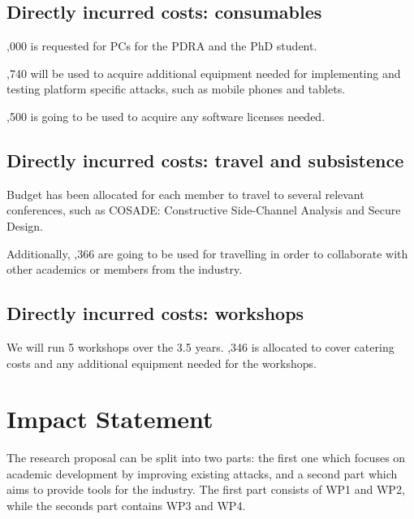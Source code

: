 \documentclass[a4paper,11pt]{article}
\begin{document}
\subsection*{Directly incurred costs: consumables}
,000 is requested for PCs for the PDRA and the PhD student.

,740 will be used to acquire additional equipment needed for implementing and testing platform specific attacks, such as mobile phones and tablets.

,500 is going to be used to acquire any software licenses needed.

\subsection*{Directly incurred costs: travel and subsistence}
Budget has been allocated for each member to travel to several relevant conferences, such as COSADE: Constructive Side-Channel Analysis and Secure Design.

Additionally, ,366 are going to be used for travelling in order to collaborate with other academics or members from the industry.

\subsection*{Directly incurred costs: workshops}
We will run 5 workshops over the 3.5 years. ,346 is allocated to cover catering costs and any additional equipment needed for the workshops.
 

\newpage
\section*{Impact Statement}


The research proposal can be split into two parts: the first one which focuses on academic development by improving existing attacks, and a second part which aims to provide tools for the industry. The first part consists of WP1 and WP2, while the seconds part contains WP3 and WP4. 
\end{document}
